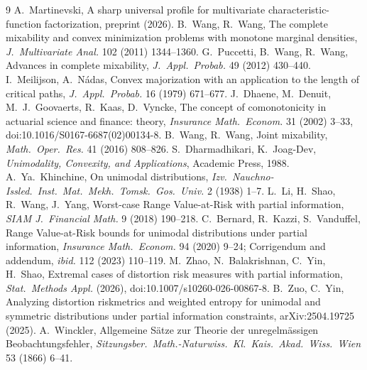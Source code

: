 \documentclass[11pt]{amsart}
\theoremstyle{definition}\newtheorem{definition}[theorem]{Definition}\theoremstyle{remark}\newtheorem{remark}[theorem]{Remark}
\begin{document}
\begin{thebibliography}{9}
 A.~Martinevski, A sharp universal profile for multivariate characteristic-function factorization, preprint (2026).
 B.~Wang, R.~Wang, The complete mixability and convex minimization problems with monotone marginal densities,
\emph{J.\ Multivariate Anal.} 102 (2011) 1344--1360.
 G.~Puccetti, B.~Wang, R.~Wang, Advances in complete mixability, \emph{J.\ Appl.\ Probab.} 49 (2012) 430--440.
 I.~Meilijson, A.~N\'adas, Convex majorization with an application to the length of critical paths, \emph{J.\ Appl.\ Probab.} 16 (1979) 671--677.
 J.~Dhaene, M.~Denuit, M.~J.~Goovaerts, R.~Kaas, D.~Vyncke, The concept of comonotonicity in actuarial science and finance: theory,
\emph{Insurance Math.\ Econom.} 31 (2002) 3--33, doi:10.1016/S0167-6687(02)00134-8.
 B.~Wang, R.~Wang, Joint mixability, \emph{Math.\ Oper.\ Res.} 41 (2016) 808--826.
 S.~Dharmadhikari, K.~Joag-Dev, \emph{Unimodality, Convexity, and Applications}, Academic Press, 1988.
 A.~Ya.~Khinchine, On unimodal distributions, \emph{Izv.\ Nauchno-Issled.\ Inst.\ Mat.\ Mekh.\ Tomsk.\ Gos.\ Univ.} 2 (1938) 1--7.
 L.~Li, H.~Shao, R.~Wang, J.~Yang, Worst-case Range Value-at-Risk with partial information, \emph{SIAM J.\ Financial Math.} 9 (2018) 190--218.
 C.~Bernard, R.~Kazzi, S.~Vanduffel, Range Value-at-Risk bounds for unimodal distributions under partial information, \emph{Insurance Math.\ Econom.} 94 (2020)
9--24; Corrigendum and addendum, \emph{ibid.} 112 (2023) 110--119.
 M.~Zhao, N.~Balakrishnan, C.~Yin, H.~Shao, Extremal cases of distortion risk measures with partial information, \emph{Stat.\ Methods Appl.} (2026),
doi:10.1007/s10260-026-00867-8.
 B.~Zuo, C.~Yin, Analyzing distortion riskmetrics and weighted entropy for unimodal and symmetric distributions under partial information constraints,
arXiv:2504.19725 (2025).
 A.~Winckler, Allgemeine S\"atze zur Theorie der unregelm\"assigen Beobachtungsfehler, \emph{Sitzungsber.\ Math.-Naturwiss.\ Kl.\ Kais.\ Akad.\ Wiss.\ Wien}
53 (1866) 6--41.
\end{thebibliography}
\end{document}
